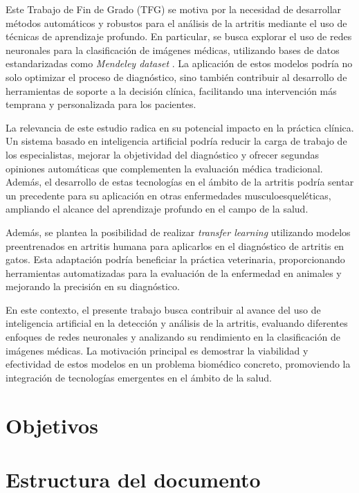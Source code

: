 \documentclass[11pt,spanish,listoffigures,listoftables]{tfgetsinf}
\begin{document}
Este Trabajo de Fin de Grado (TFG) se motiva por la necesidad de desarrollar métodos automáticos y robustos para el análisis de la artritis mediante el uso de técnicas de aprendizaje profundo. En particular, se busca explorar el uso de redes neuronales para la clasificación de imágenes médicas, utilizando bases de datos estandarizadas como \textit{Mendeley dataset} \cite{chen2018knee}. La aplicación de estos modelos podría no solo optimizar el proceso de diagnóstico, sino también contribuir al desarrollo de herramientas de soporte a la decisión clínica, facilitando una intervención más temprana y personalizada para los pacientes.

La relevancia de este estudio radica en su potencial impacto en la práctica clínica. Un sistema basado en inteligencia artificial podría reducir la carga de trabajo de los especialistas, mejorar la objetividad del diagnóstico y ofrecer segundas opiniones automáticas que complementen la evaluación médica tradicional. Además, el desarrollo de estas tecnologías en el ámbito de la artritis podría sentar un precedente para su aplicación en otras enfermedades musculoesqueléticas, ampliando el alcance del aprendizaje profundo en el campo de la salud.

Además, se plantea la posibilidad de realizar \textit{transfer learning} utilizando modelos preentrenados en artritis humana para aplicarlos en el diagnóstico de artritis en gatos. Esta adaptación podría beneficiar la práctica veterinaria, proporcionando herramientas automatizadas para la evaluación de la enfermedad en animales y mejorando la precisión en su diagnóstico.

En este contexto, el presente trabajo busca contribuir al avance del uso de inteligencia artificial en la detección y análisis de la artritis, evaluando diferentes enfoques de redes neuronales y analizando su rendimiento en la clasificación de imágenes médicas. La motivación principal es demostrar la viabilidad y efectividad de estos modelos en un problema biomédico concreto, promoviendo la integración de tecnologías emergentes en el ámbito de la salud.


\section{Objetivos}      %

\section{Estructura del documento}  %
\end{document}
